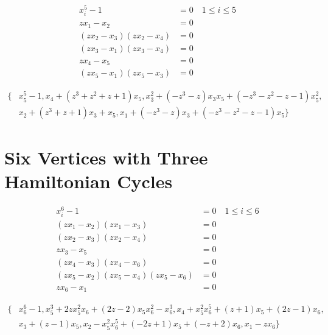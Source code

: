 \documentclass[letterpaper]{article}
\newcommand{\aln}[1]{\begin{align*} #1 \end{align*}} %
\begin{document}
\aln{
  x_i^5 - 1 &= 0 \quad 1 \leq i \leq 5\\
  z x_1 - x_2 &= 0\\
  (z x_2 - x_3) (z x_2 - x_4) &= 0\\
  (z x_3 - x_1) (z x_3 - x_4) &= 0\\
  z x_4 - x_5 &= 0\\
  (z x_5 - x_1) (z x_5 - x_3) &= 0
}

\aln{
  \{& x_5^5-1, x_4+(z^3+z^2+z+1)x_5, x_3^2+(-z^3-z)x_3x_5+(-z^3-z^2-z-1)x_5^2,\\& x_2+(z^3+z+1)x_3+x_5, x_1+(-z^3-z)x_3+(-z^3-z^2-z-1)x_5\}
}

\newpage

\section{Six Vertices with Three Hamiltonian Cycles}
\begin{center}
\end{center}

\aln{
  x_i^6 - 1 &= 0 \quad 1 \leq i \leq 6\\
  (z x_1 - x_2) (z x_1 - x_3) &= 0\\
  (z x_2 - x_3) (z x_2 - x_4) &= 0\\
  z x_3 - x_5 &= 0\\
  (z x_4 - x_3) (z x_4 - x_6) &= 0\\
  (z x_5 - x_2) (z x_5 - x_4) (z x_5 - x_6) &= 0\\
  z x_6 - x_1 &= 0
}

\aln{
  \{& x_6^6-1, x_5^3+2zx_5^2x_6+(2z-2)x_5x_6^2-x_6^3, x_4+x_5^2x_6^5+(z+1)x_5+(2z-1)x_6,\\& x_3+(z-1)x_5, x_2-x_5^2x_6^5+(-2z+1)x_5+(-z+2)x_6, x_1-zx_6\}
}
\end{document}
